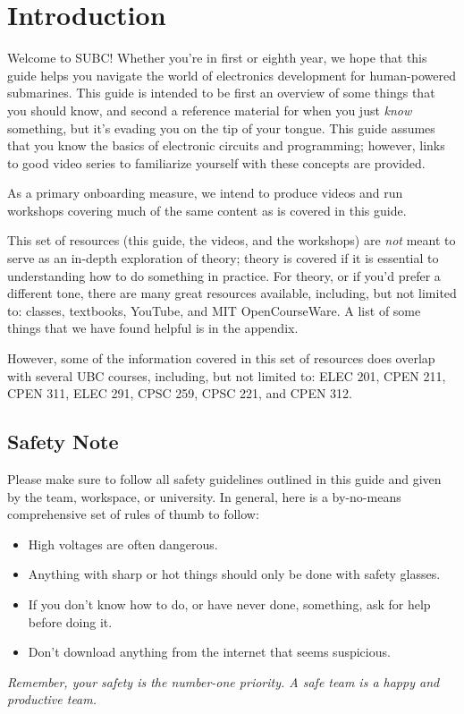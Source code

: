 \chapter{Introduction}
Welcome to SUBC! Whether you're in first or eighth year, we hope that this guide helps you navigate the world of electronics development for human-powered submarines. This guide is intended to be first an overview of some things that you should know, and second a reference material for when you just \emph{know} something, but it's evading you on the tip of your tongue. This guide assumes that you know the basics of electronic circuits and programming; however, links to good video series to familiarize yourself with these concepts are provided.

As a primary onboarding measure, we intend to produce videos and run workshops covering much of the same content as is covered in this guide.

This set of resources (this guide, the videos, and the workshops) are \emph{not} meant to serve as an in-depth exploration of theory; theory is covered if it is essential to understanding how to do something in practice. For theory, or if you'd prefer a different tone, there are many great resources available, including, but not limited to: classes, textbooks, YouTube, and MIT OpenCourseWare. A list of some things that we have found helpful is in the appendix.

However, some of the information covered in this set of resources does overlap with several UBC courses, including, but not limited to: ELEC 201, CPEN 211, CPEN 311, ELEC 291, CPSC 259, CPSC 221, and CPEN 312.

\section{Safety Note}
Please make sure to follow all safety guidelines outlined in this guide and given by the team, workspace, or university. In general, here is a by-no-means comprehensive set of rules of thumb to follow:
\begin{itemize}
	\item High voltages are often dangerous.
	\item Anything with sharp or hot things should only be done with safety glasses.
	\item If you don't know how to do, or have never done, something, ask for help before doing it.
	\item Don't download anything from the internet that seems suspicious.
\end{itemize}
\emph{Remember, your safety is the number-one priority. A safe team is a happy and productive team.}

